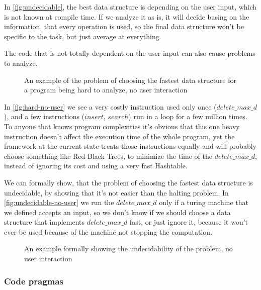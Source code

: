 \documentclass[a4paper,11pt]{article}
\begin{document}
		In \autoref{fig:undecidable}, the best data structure is depending on the user input, which is not known at
		compile time. If we analyze it as is, it will decide basing on the information, that every operation is
		used, so the final data structure won't be specific to the task, but just average at everything.

		The code that is not totally dependent on the user input can also cause problems to analyze.

        \begin{figure}[!h]
			

			\caption{An example of the problem of choosing the fastest data structure for a program being hard to
            analyze, no user interaction}

			\label{fig:hard-no-user}
		\end{figure}

		In \autoref{fig:hard-no-user} we see a very costly instruction used only once
		($delete\_max\_d$), and a few instructions ($insert$, $search$) run in a loop for a few million times.
		To anyone that knows program complexities it's obvious that this one heavy instruction doesn't affect
		the execution time of the whole program, yet the framework at the current state treats those
		instructions equally and will probably choose something like Red-Black Trees, to minimize the time of
		the $delete\_max\_d$, instead of ignoring its cost and using a very fast Hashtable.

        We can formally show, that the problem of choosing the fastest data structure is undecidable, by showing that
        it's not easier than the halting problem. In \autoref{fig:undecidable-no-user} we run the $delete\_max\_d$ only
        if a turing machine that we defined accepts an input, so we don't know if we should choose a data structure that
        implements $delete\_max\_d$ fast, or just ignore it, because it won't ever be used because of the machine not
        stopping the computation.

        \begin{figure}
			

			\caption{An example formally showing the undecidability of the problem, no user interaction}

			\label{fig:undecidable-no-user}
		\end{figure}

		\subsubsection{Code pragmas} \label{sec:pragmas}
\end{document}
